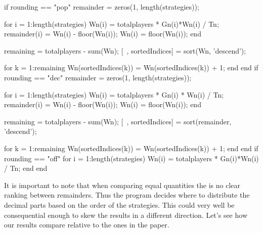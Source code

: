\begin{}
if rounding == "pop"
    remainder = zeros(1, length(strategies));

    for i = 1:length(strategies)
        Wn(i) = totalplayers * Gn(i)*Wn(i) / Tn;
        remainder(i) = Wn(i) - floor(Wn(i));
        Wn(i) = floor(Wn(i));
    end

    remaining = totalplayers - sum(Wn);  %
    [~, sortedIndices] = sort(Wn, 'descend');  %

    for k = 1:remaining
        Wn(sortedIndices(k)) = Wn(sortedIndices(k)) + 1;
    end
end
if rounding == "dec"
    remainder = zeros(1, length(strategies));

    for i = 1:length(strategies)
        Wn(i) = totalplayers * Gn(i) * Wn(i) / Tn;
        remainder(i) = Wn(i) - floor(Wn(i));
        Wn(i) = floor(Wn(i));
    end

    remaining = totalplayers - sum(Wn);  %
    [~, sortedIndices] = sort(remainder, 'descend');  %

    for k = 1:remaining
        Wn(sortedIndices(k)) = Wn(sortedIndices(k)) + 1;
    end
end            
if rounding == "off"
    for i = 1:length(strategies)
        Wn(i) = totalplayers * Gn(i)*Wn(i) / Tn;
    end
end
\end{}
It is important to note that when comparing equal quantities the is no clear ranking between remainders. Thus the program decides where to distribute the decimal parts based on the order of the strategies. This could very well be consequential enough to skew the results in a different direction. Let's see how our results compare relative to the ones in the paper.

